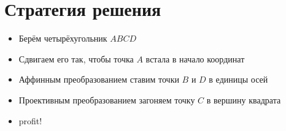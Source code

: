 \section{Стратегия решения}

\begin{itemize}
\item Берём четырёхугольник $ABCD$
\item Сдвигаем его так, чтобы точка $A$ встала в начало координат
\item Аффинным преобразованием ставим точки $B$ и $D$ в единицы осей
\item Проективным преобразованием загоняем точку $C$ в вершину квадрата
\item profit!
\end{itemize}